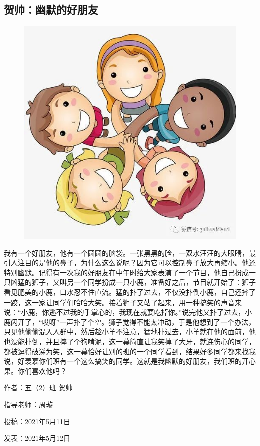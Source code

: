 \vspace{10pt}

{\centering\subsection*{贺帅：幽默的好朋友}}


\renewcommand{\leftmark}{贺帅：幽默的好朋友}

\begin{figure}[htbp]

\centering

\includegraphics[width = .5\textwidth]{./ch/26.jpg}

\end{figure}





我有一个好朋友，他有一个圆圆的脑袋。一张黑黑的脸，一双水汪汪的大眼睛，最引人注目的是他的鼻子，为什么这么说呢？因为它可以控制鼻子放大再缩小。他还特别幽默。记得有一次我的好朋友在中午时给大家表演了一个节目，他自己扮成一只凶猛的狮子，又叫另一个同学扮成一只小鹿，准备好之后，节目就开始了：狮子看见肥美的小鹿，口水忍不住直流。猛的扑了过去，不仅没扑倒小鹿，自己还摔了一跤，这一家让同学们哈哈大笑。接着狮子又站了起来，用一种搞笑的声音来说：“小鹿，你逃不过我的手掌心的，我现在就要吃掉你。”说完他又扑了过去，小鹿闪开了，“哎呀”一声扑了个空。狮子觉得不能太冲动，于是他想到了一个办法，只见他偷偷混入人群中，然后趁小羊不注意，猛地扑过去，小羊就在他的面前，他也没能扑倒，并且摔了个狗啃泥，这一幕简直让我笑掉了大牙，就连伤心的同学，都被逗得破涕为笑，这一幕恰好让别的班的一个同学看到，结果好多同学都来找我说，好羡慕你们班有一个这么搞笑的同学。这就是我幽默的好朋友，我们班的开心果。你们喜欢他吗？





\vspace{10pt}



作者：五（2）班 贺帅



指导老师：周璇



投稿：2021年5月11日



发表：2021年5月12日










                



\vspace{10pt}

\hline



